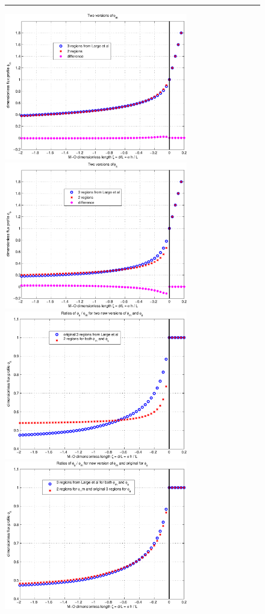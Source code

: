\begin{figure}[h!t]
\rule{\textwidth}{0.005in}
\begin{center}
\includegraphics[angle=0,width=8cm]{./figs/phi_m_profiles.pdf}
\includegraphics[angle=0,width=8cm]{./figs/phi_s_profiles.pdf}
\\
\includegraphics[angle=0,width=8cm]{./figs/prandtl_profiles_phim_phis.pdf}
\includegraphics[angle=0,width=8cm]{./figs/prandtl_profiles_just_phim_new.pdf}

\end{center}
\end{figure}
